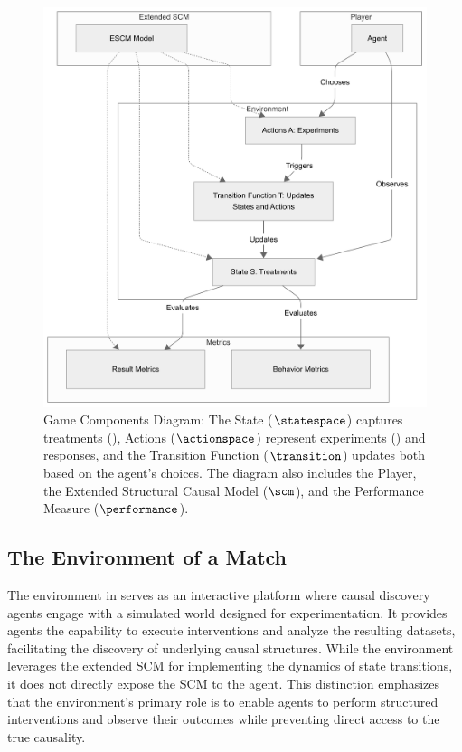 \documentclass{article}
\begin{document}
        \begin{figure}[ht]
            \centering
            \includegraphics[width=0.7\columnwidth]{assets/game_components.png}
            \caption{
                Game Components Diagram: The State ($\statespace$) captures treatments (\treatments), Actions ($\actionspace$) represent experiments (\experiments) and responses, and the Transition Function ($\transition$) updates both based on the agent’s choices. The diagram also includes the Player, the Extended Structural Causal Model ($\scm$), and the Performance Measure ($\performance$).
            } 
            \label{fig:game_components}
        \end{figure}



    \subsection{The Environment of a Match}
        The environment in \game serves as an interactive platform where causal discovery agents engage with a simulated world designed for experimentation. 
        It provides agents the capability to execute interventions and analyze the resulting datasets, facilitating the discovery of underlying causal structures. 
        While the environment leverages the extended SCM for implementing the dynamics of state transitions, it does not directly expose the SCM to the agent.
        This distinction emphasizes that the environment’s primary role is to enable agents to perform structured interventions and observe their outcomes while preventing direct access to the true causality.
\end{document}
